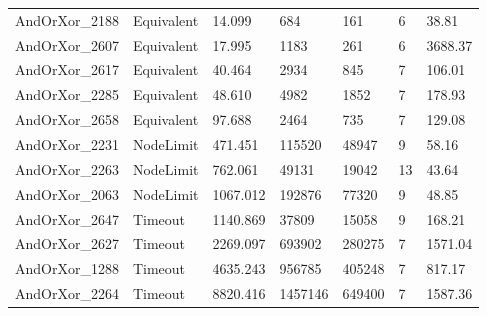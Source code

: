 \begin{tabular}{lllllll}
AndOrXor\_2188 & Equivalent & 14.099 & 684 & 161 & 6 & 38.81 \\
AndOrXor\_2607 & Equivalent & 17.995 & 1183 & 261 & 6 & 3688.37 \\
AndOrXor\_2617 & Equivalent & 40.464 & 2934 & 845 & 7 & 106.01 \\
AndOrXor\_2285 & Equivalent & 48.610 & 4982 & 1852 & 7 & 178.93 \\
AndOrXor\_2658 & Equivalent & 97.688 & 2464 & 735 & 7 & 129.08 \\
AndOrXor\_2231 & NodeLimit & 471.451 & 115520 & 48947 & 9 & 58.16 \\
AndOrXor\_2263 & NodeLimit & 762.061 & 49131 & 19042 & 13 & 43.64 \\
AndOrXor\_2063 & NodeLimit & 1067.012 & 192876 & 77320 & 9 & 48.85 \\
AndOrXor\_2647 & Timeout & 1140.869 & 37809 & 15058 & 9 & 168.21 \\
AndOrXor\_2627 & Timeout & 2269.097 & 693902 & 280275 & 7 & 1571.04 \\
AndOrXor\_1288 & Timeout & 4635.243 & 956785 & 405248 & 7 & 817.17 \\
AndOrXor\_2264 & Timeout & 8820.416 & 1457146 & 649400 & 7 & 1587.36 \\
\bottomrule
\end{tabular}

